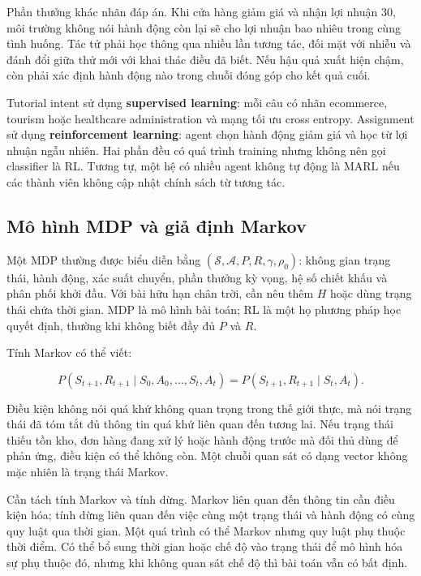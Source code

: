 Phần thưởng khác nhãn đáp án. Khi cửa hàng giảm giá và nhận lợi nhuận
30, môi trường không nói hành động còn lại sẽ cho lợi nhuận bao nhiêu
trong cùng tình huống. Tác tử phải học thông qua nhiều lần tương tác,
đối mặt với nhiễu và đánh đổi giữa thử mới với khai thác điều đã biết.
Nếu hậu quả xuất hiện chậm, còn phải xác định hành động nào trong chuỗi
đóng góp cho kết quả cuối.

Tutorial intent sử dụng \textbf{supervised learning}: mỗi câu có nhãn
ecommerce, tourism hoặc healthcare administration và mạng tối ưu cross
entropy. Assignment sử dụng \textbf{reinforcement learning}: agent chọn
hành động giảm giá và học từ lợi nhuận ngẫu nhiên. Hai phần đều có quá
trình training nhưng không nên gọi classifier là RL. Tương tự, một hệ có
nhiều agent không tự động là MARL nếu các thành viên không cập nhật
chính sách từ tương tác.

\subsection{Mô hình MDP và giả định
Markov}\label{muxf4-huxecnh-mdp-vuxe0-giux1ea3-ux111ux1ecbnh-markov}

Một MDP thường được biểu diễn bằng
\((\mathcal S,\mathcal A,P,R,\gamma,\rho_0)\): không gian trạng thái,
hành động, xác suất chuyển, phần thưởng kỳ vọng, hệ số chiết khấu và
phân phối khởi đầu. Với bài hữu hạn chân trời, cần nêu thêm \(H\) hoặc
dùng trạng thái chứa thời gian. MDP là mô hình bài toán; RL là một họ
phương pháp học quyết định, thường khi không biết đầy đủ \(P\) và \(R\).

Tính Markov có thể viết:

\[P(S_{t+1},R_{t+1}\mid S_0,A_0,\ldots,S_t,A_t)
=P(S_{t+1},R_{t+1}\mid S_t,A_t).\]

Điều kiện không nói quá khứ không quan trọng trong thế giới thực, mà nói
trạng thái đã tóm tắt đủ thông tin quá khứ liên quan đến tương lai. Nếu
trạng thái thiếu tồn kho, đơn hàng đang xử lý hoặc hành động trước mà
đối thủ dùng để phản ứng, điều kiện có thể không còn. Một chuỗi quan sát
có dạng vector không mặc nhiên là trạng thái Markov.

Cần tách tính Markov và tính dừng. Markov liên quan đến thông tin cần
điều kiện hóa; tính dừng liên quan đến việc cùng một trạng thái và hành
động có cùng quy luật qua thời gian. Một quá trình có thể Markov nhưng
quy luật phụ thuộc thời điểm. Có thể bổ sung thời gian hoặc chế độ vào
trạng thái để mô hình hóa sự phụ thuộc đó, nhưng khi không quan sát chế
độ thì bài toán vẫn có bất định.

